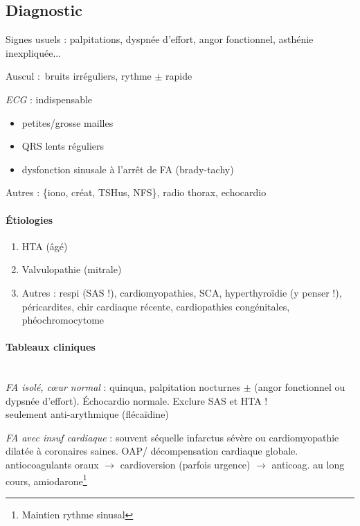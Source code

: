 \documentclass{article}
\def\arrow{$\rightarrow$}
\begin{document}
\subsection{Diagnostic}
Signes usuels : palpitations, dyspnée d'effort, angor fonctionnel, asthénie
inexpliquée...

Auscul : bruits irréguliers, rythme $\pm$ rapide

\textit{ECG} : indispensable \danger
\begin{itemize}
  \item petites/grosse mailles
  \item QRS lents réguliers
  \item dysfonction sinusale à l'arrêt de \gls{FA} (brady-tachy)
\end{itemize}

Autres : \{iono, créat, TSHus, NFS\}, radio thorax, echocardio

\paragraph{Étiologies}
\begin{enumerate}
  \item HTA (âgé)
  \item Valvulopathie (mitrale)
  \item Autres : respi (SAS !), cardiomyopathies, SCA, hyperthyroïdie (y penser
    !), péricardites, chir cardiaque récente, cardiopathies congénitales,
    phéochromocytome
\end{enumerate}

\paragraph{Tableaux cliniques}\mbox{}\\
\textit{FA isolé, c\oe{}ur normal} : quinqua, palpitation nocturnes $\pm$ (angor
fonctionnel ou dypsnée d'effort). Échocardio normale. Exclure SAS et HTA !\\
\hspace*{10pt}\thus seulement anti-arythmique (flécaïdine)

\textit{FA avec insuf cardiaque} : souvent séquelle infarctus sévère ou
cardiomyopathie dilatée à coronaires saines. OAP/ décompensation cardiaque
globale.\\
\hspace*{10pt}\thus antiocoagulants oraux \arrow{} cardioversion (parfois urgence) \arrow{}
anticoag. au long cours, amiodarone\footnote{Maintien rythme sinusal}
\end{document}
